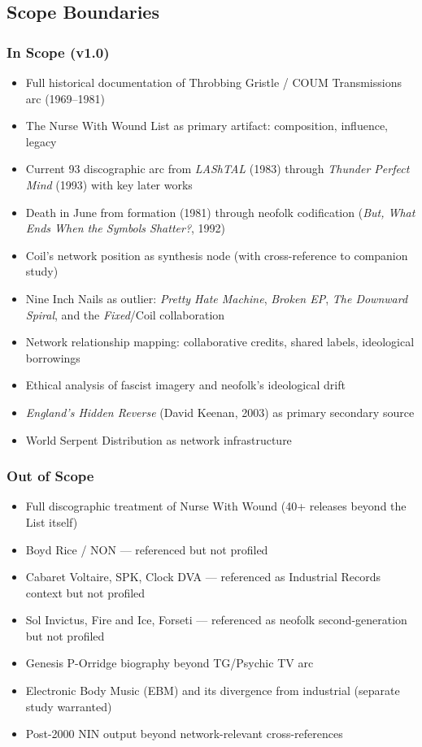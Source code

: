 \documentclass[11pt,letterpaper]{article}
\begin{document}
\subsection{Scope Boundaries}

\subsubsection{In Scope (v1.0)}

\begin{itemize}[noitemsep]
  \item Full historical documentation of Throbbing Gristle / COUM Transmissions arc (1969--1981)
  \item The Nurse With Wound List as primary artifact: composition, influence, legacy
  \item Current 93 discographic arc from \textit{LAShTAL} (1983) through \textit{Thunder Perfect Mind} (1993) with key later works
  \item Death in June from formation (1981) through neofolk codification (\textit{But, What Ends When the Symbols Shatter?}, 1992)
  \item Coil's network position as synthesis node (with cross-reference to companion study)
  \item Nine Inch Nails as outlier: \textit{Pretty Hate Machine}, \textit{Broken EP}, \textit{The Downward Spiral}, and the \textit{Fixed}/Coil collaboration
  \item Network relationship mapping: collaborative credits, shared labels, ideological borrowings
  \item Ethical analysis of fascist imagery and neofolk's ideological drift
  \item \textit{England's Hidden Reverse} (David Keenan, 2003) as primary secondary source
  \item World Serpent Distribution as network infrastructure
\end{itemize}

\subsubsection{Out of Scope}

\begin{itemize}[noitemsep]
  \item Full discographic treatment of Nurse With Wound (40+ releases beyond the List itself)
  \item Boyd Rice / NON — referenced but not profiled
  \item Cabaret Voltaire, SPK, Clock DVA — referenced as Industrial Records context but not profiled
  \item Sol Invictus, Fire and Ice, Forseti — referenced as neofolk second-generation but not profiled
  \item Genesis P-Orridge biography beyond TG/Psychic TV arc
  \item Electronic Body Music (EBM) and its divergence from industrial (separate study warranted)
  \item Post-2000 NIN output beyond network-relevant cross-references
\end{itemize}
\end{document}
